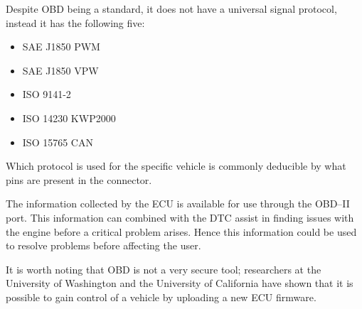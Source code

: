 \bigskip
Despite \ac{OBD} being a standard, it does not have a universal signal protocol, instead it has the following five:
\begin{multicols}{2}
\begin{itemize}
    \item SAE J1850 PWM
    \item SAE J1850 VPW
    \item ISO 9141-2
    \item ISO 14230 KWP2000
    \item ISO 15765 CAN
\end{itemize}
\end{multicols}
Which protocol is used for the specific vehicle is commonly deducible by what pins are present in the connector.

The information collected by the \ac{ECU} is available for use through the OBD--II port.
This information can combined with the \ac{DTC} assist in finding issues with the engine before a critical problem arises.
Hence this information could be used to resolve problems before affecting the user.

\medskip
It is worth noting that \ac{OBD} is not a very secure tool; researchers at the University of Washington and the University of California have shown that it is possible to gain control of a vehicle by uploading a new \ac{ECU} firmware\cite{OBDSecurity}.

